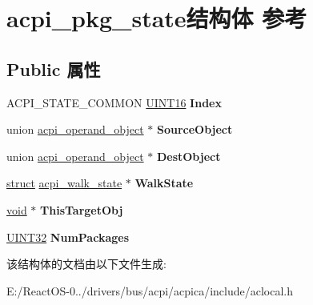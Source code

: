 \hypertarget{structacpi__pkg__state}{}\section{acpi\+\_\+pkg\+\_\+state结构体 参考}
\label{structacpi__pkg__state}
\subsection*{Public 属性}
\begin{DoxyCompactItemize}
\item 
\mbox{\label{structacpi__pkg__state_a7d51243ef229ee17b011a23d25df2bd4}} 
A\+C\+P\+I\+\_\+\+S\+T\+A\+T\+E\+\_\+\+C\+O\+M\+M\+ON \hyperlink{_processor_bind_8h_a09f1a1fb2293e33483cc8d44aefb1eb1}{U\+I\+N\+T16} {\bfseries Index}
\item 
\mbox{\label{structacpi__pkg__state_a32126c2dd29ebcf17dc7a86a38f25f17}} 
union \hyperlink{unionacpi__operand__object}{acpi\+\_\+operand\+\_\+object} $\ast$ {\bfseries Source\+Object}
\item 
\mbox{\label{structacpi__pkg__state_a6b1c0ae50c6b1bc0a849fce2ec57193b}} 
union \hyperlink{unionacpi__operand__object}{acpi\+\_\+operand\+\_\+object} $\ast$ {\bfseries Dest\+Object}
\item 
\mbox{\label{structacpi__pkg__state_a3bfc5a1d0db52398b04bc7bcba26b056}} 
\hyperlink{interfacestruct}{struct} \hyperlink{structacpi__walk__state}{acpi\+\_\+walk\+\_\+state} $\ast$ {\bfseries Walk\+State}
\item 
\mbox{\label{structacpi__pkg__state_a30f3b018d74951b4ec9b558e52bb4377}} 
\hyperlink{interfacevoid}{void} $\ast$ {\bfseries This\+Target\+Obj}
\item 
\mbox{\label{structacpi__pkg__state_ac80ce96c5d5c7d3ccded7603ec741493}} 
\hyperlink{_processor_bind_8h_ae1e6edbbc26d6fbc71a90190d0266018}{U\+I\+N\+T32} {\bfseries Num\+Packages}
\end{DoxyCompactItemize}


该结构体的文档由以下文件生成\+:\begin{DoxyCompactItemize}
\item 
E\+:/\+React\+O\+S-\/0../drivers/bus/acpi/acpica/include/aclocal.\+h\end{DoxyCompactItemize}
